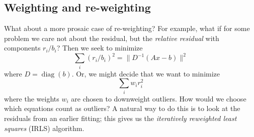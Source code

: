 \subsection{Weighting and re-weighting}

What about a more prosaic case of re-weighting?  For example, what if
for some problem we care not about the residual, but the {\em relative
residual} with components $r_i/b_i$?  Then we seek to minimize
\[
  \sum_i (r_i/b_i)^2 = \|D^{-1} (Ax-b)\|^2
\]
where $D = \operatorname{diag}(b)$.  Or, we might decide that
we want to minimize
\[
  \sum_i w_i r_i^2
\]
where the weights $w_i$ are chosen to downweight outliers.  How would
we choose which equations count as outliers?  A natural way to do this
is to look at the residuals from an earlier fitting; this gives us the
{\em iteratively reweighted least squares} (IRLS) algorithm.
